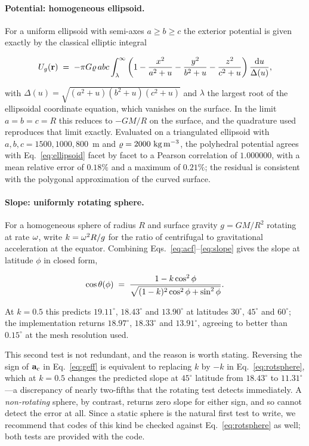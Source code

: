 \paragraph{Potential: homogeneous ellipsoid.} For a uniform ellipsoid with
semi-axes $a\ge b\ge c$ the exterior potential is given exactly by the
classical elliptic integral

\begin{equation}
U_{g}(\mathbf{r}) \;=\; -\pi G\varrho\,abc \int_{\lambda}^{\infty}
\left(1 - \frac{x^{2}}{a^{2}+u} - \frac{y^{2}}{b^{2}+u}
        - \frac{z^{2}}{c^{2}+u}\right)
\frac{\mathrm{d}u}{\Delta(u)},
\label{eq:ellipsoid}
\end{equation}

with $\Delta(u)=\sqrt{(a^{2}+u)(b^{2}+u)(c^{2}+u)}$ and $\lambda$ the largest
root of the ellipsoidal coordinate equation, which vanishes on the surface. In
the limit $a=b=c=R$ this reduces to $-GM/R$ on the surface, and the quadrature
used reproduces that limit exactly. Evaluated on a triangulated ellipsoid with
$a,b,c=1500,1000,800$~m and $\varrho=2000\ \mathrm{kg\,m^{-3}}$, the polyhedral
potential agrees with Eq.~\eqref{eq:ellipsoid} facet by facet to a Pearson
correlation of $1.000000$, with a mean relative error of $0.18\%$ and a maximum
of $0.21\%$; the residual is consistent with the polygonal approximation of the
curved surface.

\paragraph{Slope: uniformly rotating sphere.} For a homogeneous sphere of
radius $R$ and surface gravity $g=GM/R^{2}$ rotating at rate $\omega$, write
$k=\omega^{2}R/g$ for the ratio of centrifugal to gravitational acceleration
at the equator. Combining Eqs.~\eqref{eq:acf}--\eqref{eq:slope} gives the slope
at latitude $\phi$ in closed form,

\begin{equation}
\cos\theta(\phi) \;=\;
\frac{1-k\cos^{2}\phi}
     {\sqrt{(1-k)^{2}\cos^{2}\phi+\sin^{2}\phi}}.
\label{eq:rotsphere}
\end{equation}

At $k=0.5$ this predicts $19.11^{\circ}$, $18.43^{\circ}$ and $13.90^{\circ}$
at latitudes $30^{\circ}$, $45^{\circ}$ and $60^{\circ}$; the implementation
returns $18.97^{\circ}$, $18.33^{\circ}$ and $13.91^{\circ}$, agreeing to
better than $0.15^{\circ}$ at the mesh resolution used.

This second test is not redundant, and the reason is worth stating. Reversing
the sign of $\mathbf{a}_{\mathrm{c}}$ in Eq.~\eqref{eq:geff} is equivalent to replacing $k$ by
$-k$ in Eq.~\eqref{eq:rotsphere}, which at $k=0.5$ changes the predicted slope
at $45^{\circ}$ latitude from $18.43^{\circ}$ to $11.31^{\circ}$---a
discrepancy of nearly two-fifths that the rotating test detects immediately.
A \emph{non-rotating} sphere, by contrast, returns zero slope for either sign,
and so cannot detect the error at all. Since a static sphere is the natural
first test to write, we recommend that codes of this kind be checked against
Eq.~\eqref{eq:rotsphere} as well; both tests are provided with the code.

